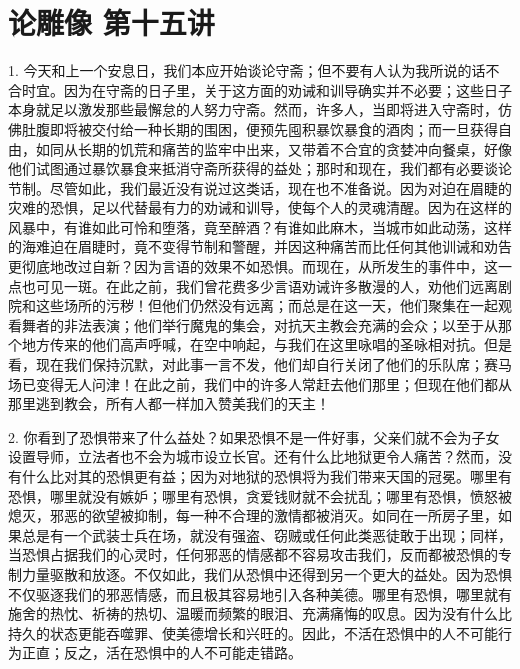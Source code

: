 

\section{论雕像 第十五讲}

\par

1. 今天和上一个安息日，我们本应开始谈论守斋；但不要有人认为我所说的话不合时宜。因为在守斋的日子里，关于这方面的劝诫和训导确实并不必要；这些日子本身就足以激发那些最懈怠的人努力守斋。然而，许多人，当即将进入守斋时，仿佛肚腹即将被交付给一种长期的围困，便预先囤积暴饮暴食的酒肉；而一旦获得自由，如同从长期的饥荒和痛苦的监牢中出来，又带着不合宜的贪婪冲向餐桌，好像他们试图通过暴饮暴食来抵消守斋所获得的益处；那时和现在，我们都有必要谈论节制。尽管如此，我们最近没有说过这类话，现在也不准备说。因为对迫在眉睫的灾难的恐惧，足以代替最有力的劝诫和训导，使每个人的灵魂清醒。因为在这样的风暴中，有谁如此可怜和堕落，竟至醉酒？有谁如此麻木，当城市如此动荡，这样的海难迫在眉睫时，竟不变得节制和警醒，并因这种痛苦而比任何其他训诫和劝告更彻底地改过自新？因为言语的效果不如恐惧。而现在，从所发生的事件中，这一点也可见一斑。在此之前，我们曾花费多少言语劝诫许多散漫的人，劝他们远离剧院和这些场所的污秽！但他们仍然没有远离；而总是在这一天，他们聚集在一起观看舞者的非法表演；他们举行魔鬼的集会，对抗天主教会充满的会众；以至于从那个地方传来的他们高声呼喊，在空中响起，与我们在这里咏唱的圣咏相对抗。但是看，现在我们保持沉默，对此事一言不发，他们却自行关闭了他们的乐队席；赛马场已变得无人问津！在此之前，我们中的许多人常赶去他们那里；但现在他们都从那里逃到教会，所有人都一样加入赞美我们的天主！\par

2. 你看到了恐惧带来了什么益处？如果恐惧不是一件好事，父亲们就不会为子女设置导师，立法者也不会为城市设立长官。还有什么比地狱更令人痛苦？然而，没有什么比对其的恐惧更有益；因为对地狱的恐惧将为我们带来天国的冠冕。哪里有恐惧，哪里就没有嫉妒；哪里有恐惧，贪爱钱财就不会扰乱；哪里有恐惧，愤怒被熄灭，邪恶的欲望被抑制，每一种不合理的激情都被消灭。如同在一所房子里，如果总是有一个武装士兵在场，就没有强盗、窃贼或任何此类恶徒敢于出现；同样，当恐惧占据我们的心灵时，任何邪恶的情感都不容易攻击我们，反而都被恐惧的专制力量驱散和放逐。不仅如此，我们从恐惧中还得到另一个更大的益处。因为恐惧不仅驱逐我们的邪恶情感，而且极其容易地引入各种美德。哪里有恐惧，哪里就有施舍的热忱、祈祷的热切、温暖而频繁的眼泪、充满痛悔的叹息。因为没有什么比持久的状态更能吞噬罪、使美德增长和兴旺的。因此，不活在恐惧中的人不可能行为正直；反之，活在恐惧中的人不可能走错路。\par

